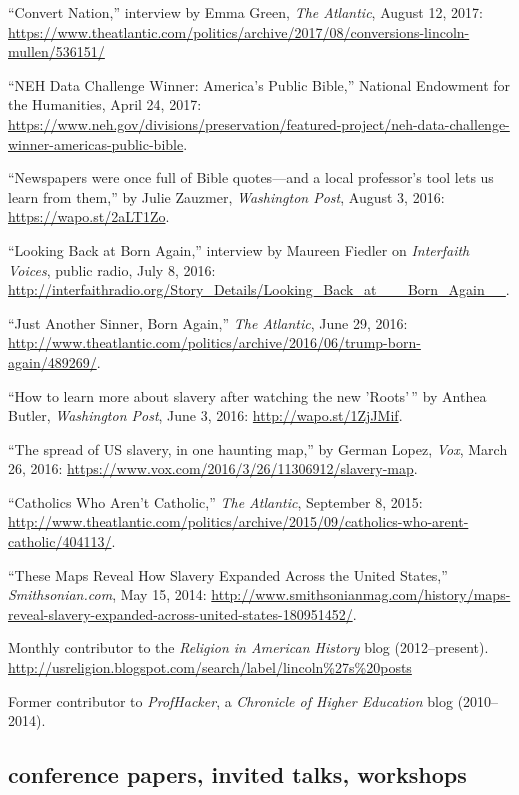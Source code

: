 \documentclass[11pt]{article}
\begin{document}
``Convert Nation,'' interview by Emma Green, \emph{The Atlantic}, August 12, 
2017: \url{https://www.theatlantic.com/politics/archive/2017/08/conversions-lincoln-mullen/536151/}

``NEH Data Challenge Winner: America's Public Bible,'' National Endowment for 
the Humanities, April 24, 2017: 
\url{https://www.neh.gov/divisions/preservation/featured-project/neh-data-challenge-winner-americas-public-bible}.

``Newspapers were once full of Bible quotes---and a local professor's tool lets 
us learn from them,'' by Julie Zauzmer, \emph{Washington Post}, August 3, 2016: 
\url{https://wapo.st/2aLT1Zo}.

``Looking Back at Born Again,'' interview by Maureen Fiedler on \emph{Interfaith Voices}, public 
radio, July 8, 2016:  
\url{http://interfaithradio.org/Story_Details/Looking_Back_at___Born_Again__}.

``Just Another Sinner, Born Again,'' \emph{The Atlantic}, June 29, 2016: 
\url{http://www.theatlantic.com/politics/archive/2016/06/trump-born-again/489269/}.

``How to learn more about slavery after watching the new 'Roots'\,'' by Anthea Butler, \emph{Washington Post}, June 3, 2016: \url{http://wapo.st/1ZjJMif}.

``The spread of US slavery, in one haunting map,'' by German Lopez, 
\emph{Vox}, March 26, 2016: 
\url{https://www.vox.com/2016/3/26/11306912/slavery-map}.

``Catholics Who Aren't Catholic,'' \emph{The Atlantic}, September 8, 
2015:  
\url{http://www.theatlantic.com/politics/archive/2015/09/catholics-who-arent-catholic/404113/}.

``These Maps Reveal How Slavery Expanded Across the United States,''
\emph{Smithsonian.com}, May 15, 2014:
\url{http://www.smithsonianmag.com/history/maps-reveal-slavery-expanded-across-united-states-180951452/}.

Monthly contributor to the \emph{Religion in American History} blog (2012--present). \url{http://usreligion.blogspot.com/search/label/lincoln\%27s\%20posts}

Former contributor to \emph{ProfHacker}, a \emph{Chronicle of Higher 
  Education} blog (2010--2014). 


\subsection{conference papers, invited 
  talks, workshops}\label{conference-papers-invited-talks}
\end{document}
